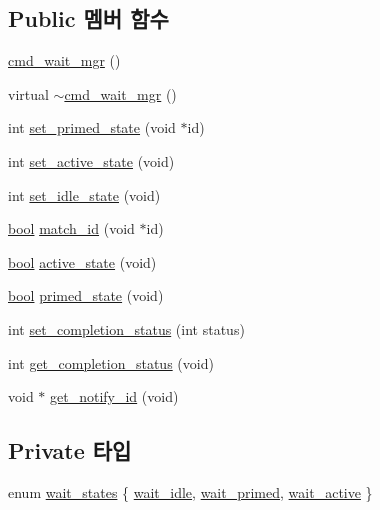 \subsection*{Public 멤버 함수}
\begin{DoxyCompactItemize}
\item 
\hyperlink{classavdecc__lib_1_1cmd__wait__mgr_a42a3b11b9d72610a2c243f19b0d16be8}{cmd\+\_\+wait\+\_\+mgr} ()
\item 
virtual \hyperlink{classavdecc__lib_1_1cmd__wait__mgr_ae59f84f496afcb9eecf40f4e7449e39a}{$\sim$cmd\+\_\+wait\+\_\+mgr} ()
\item 
int \hyperlink{classavdecc__lib_1_1cmd__wait__mgr_a6b1fee5323ede1898e201b59b429b298}{set\+\_\+primed\+\_\+state} (void $\ast$id)
\item 
int \hyperlink{classavdecc__lib_1_1cmd__wait__mgr_a87f1f4093f251dcd0a7b3636bb18b7f1}{set\+\_\+active\+\_\+state} (void)
\item 
int \hyperlink{classavdecc__lib_1_1cmd__wait__mgr_a0d5ac08693ab386df80fa285e356e4b4}{set\+\_\+idle\+\_\+state} (void)
\item 
\hyperlink{avb__gptp_8h_af6a258d8f3ee5206d682d799316314b1}{bool} \hyperlink{classavdecc__lib_1_1cmd__wait__mgr_a4ab93b35c0976b309ed639f832c6643f}{match\+\_\+id} (void $\ast$id)
\item 
\hyperlink{avb__gptp_8h_af6a258d8f3ee5206d682d799316314b1}{bool} \hyperlink{classavdecc__lib_1_1cmd__wait__mgr_a8abd7dc405798979dd738ccf88fff0bf}{active\+\_\+state} (void)
\item 
\hyperlink{avb__gptp_8h_af6a258d8f3ee5206d682d799316314b1}{bool} \hyperlink{classavdecc__lib_1_1cmd__wait__mgr_a6c44383e58fc510f2117c67b931b22c8}{primed\+\_\+state} (void)
\item 
int \hyperlink{classavdecc__lib_1_1cmd__wait__mgr_a979ab3347d7c228509b928383b7861ca}{set\+\_\+completion\+\_\+status} (int status)
\item 
int \hyperlink{classavdecc__lib_1_1cmd__wait__mgr_aa515915c2f77848f505321b080def00c}{get\+\_\+completion\+\_\+status} (void)
\item 
void $\ast$ \hyperlink{classavdecc__lib_1_1cmd__wait__mgr_acae98c938b8473f03ddd1a430e30be1d}{get\+\_\+notify\+\_\+id} (void)
\end{DoxyCompactItemize}
\subsection*{Private 타입}
\begin{DoxyCompactItemize}
\item 
enum \hyperlink{classavdecc__lib_1_1cmd__wait__mgr_a6d8ed97126bdf056391a14a921f643a8}{wait\+\_\+states} \{ \hyperlink{classavdecc__lib_1_1cmd__wait__mgr_a6d8ed97126bdf056391a14a921f643a8af918dc315c26116ff99848114dc18358}{wait\+\_\+idle}, 
\hyperlink{classavdecc__lib_1_1cmd__wait__mgr_a6d8ed97126bdf056391a14a921f643a8a75c6bbc9aac093b2b59ee35a49c71671}{wait\+\_\+primed}, 
\hyperlink{classavdecc__lib_1_1cmd__wait__mgr_a6d8ed97126bdf056391a14a921f643a8a3a49c08b68d3f5e1f225f25de33bfa43}{wait\+\_\+active}
 \}
\end{DoxyCompactItemize}
